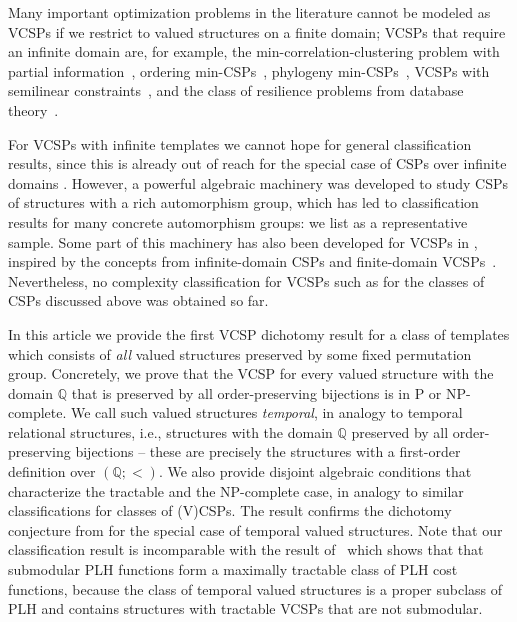 \documentclass[preprint,12pt]{elsarticle}
\newcommand{\Q}{\mathbb Q}
\begin{document}
Many important optimization problems in the literature cannot be modeled as VCSPs if we restrict to valued structures on a finite domain;
VCSPs that require an infinite domain are, for example, the min-correlation-clustering problem with partial information~\cite{CorrelationClustering,ViolaThesis}, ordering min-CSPs~\cite{ApproxOrderingCSP}, phylogeny min-CSPs~\cite{ChatziafratisM23}, VCSPs with semilinear constraints~\cite{BodirskyMaminoViola-Journal}, and the class of resilience problems from database theory~\cite{Resilience, NewResilience, LatestResilience, Resilience-VCSPs}.


For VCSPs with infinite templates we cannot hope for general classification results, since this is already out of reach for the special case of CSPs over infinite domains \cite{BodirskyGrohe}. However, a powerful algebraic machinery was developed to study CSPs of structures with a rich automorphism group,
which has led to
classification results for many concrete automorphism groups: we list \cite{tcsps-journal,BodPin-Schaefer-both,phylo-long,BBSpatial,AnOrderOutOf}
as a representative sample. Some part of this machinery has also been developed for VCSPs in \cite{Resilience-VCSPs}, inspired by the concepts from infinite-domain CSPs and finite-domain VCSPs~\cite{FullaZivny,KozikOchremiak15}. 
Nevertheless, no complexity classification for VCSPs such as for the classes of CSPs discussed above was obtained so far.

In this article we provide the first VCSP dichotomy result for a class of templates 
which consists of \emph{all} valued structures preserved by some fixed permutation group.
Concretely, we prove that the VCSP for every valued structure with the domain $\Q$ that is preserved by all order-preserving bijections is in P or NP-complete. We call such valued structures \emph{temporal}, in analogy to temporal relational structures, i.e., structures with the domain  $\Q$ preserved by all order-preserving bijections -- these are precisely the structures with a 
first-order definition over $(\Q;<)$. We also provide disjoint algebraic conditions that characterize the tractable and the NP-complete case, in analogy to similar classifications for classes of (V)CSPs. The result confirms the dichotomy conjecture from \cite[Conjecture 9.3]{Resilience-VCSPs} for the special case of temporal valued structures. Note that our classification result is incomparable with the result of~\cite{BodirskyMaminoViola-Journal} which shows that that submodular PLH functions form a maximally tractable class of PLH cost functions, because the class of temporal valued structures is a proper subclass of PLH and contains structures with tractable VCSPs that are not submodular. 
\end{document}
